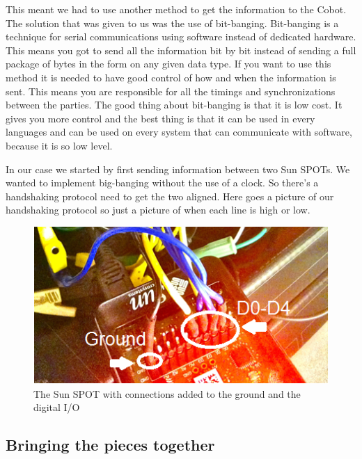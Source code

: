 \documentclass[a4paper,10pt]{article} %
\begin{document}
This meant we had to use another method to get the information to the Cobot. The
solution that was given to us was the use of bit-banging. Bit-banging is a
technique for serial communications using software instead of dedicated
hardware. This means you got to send all the information bit by bit instead of
sending a full package of bytes in the form on any given data type. If you want
to use this method it is needed to have good control of how and when the
information is sent. This means you are responsible for all the timings and
synchronizations between the parties. The good thing about bit-banging is that
it is low cost. It gives you more control and the best thing is that it can be
used in every languages and can be used on every system that can communicate
with software, because it is so low level.

In our case we started by first sending information between two Sun SPOTs. We
wanted to implement big-banging without the use of a clock. So there's a
handshaking protocol need to get the two aligned. Here goes a picture of our
handshaking protocol so just a picture of when each line is high or low.
\begin{figure}
\label{fig:sunspotconnections}
\centering
\includegraphics{img/sunspotconnections1.png}
\caption{The Sun SPOT with connections added to the ground and the digital 
I/O}
\end{figure}



\subsection{Bringing the pieces together} %
\label{subsec:Bringing the pieces together}
\end{document}
